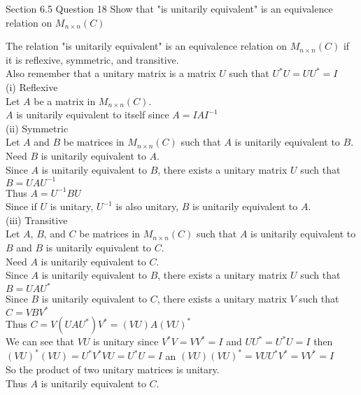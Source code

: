 \documentclass[answers,12pt,addpoints]{exam}
\begin{document}
\begin{questions}
    \question Section 6.5 Question 18
    Show that "is unitarily equivalent" is an equivalence relation on $M_{n\times n}(C)$
    \begin{solution}
        The relation "is unitarily equivalent" is an equivalence relation on $M_{n\times n}(C)$ if it is reflexive, symmetric, and transitive.\\
        Also remember that a unitary matrix is a matrix $U$ such that $U^*U = UU^* = I$\\

        (i) Reflexive\\
        Let $A$ be a matrix in $M_{n\times n}(C)$.\\
        $A$ is unitarily equivalent to itself since $A = IAI^{-1}$\\

        (ii) Symmetric\\
        Let $A$ and $B$ be matrices in $M_{n\times n}(C)$ such that $A$ is unitarily equivalent to $B$.\\
        Need $B$ is unitarily equivalent to $A$.\\
        Since $A$ is unitarily equivalent to $B$, there exists a unitary matrix $U$ such that $B = UAU^{-1}$\\
        Thus $A = U^{-1}BU$\\
        Since if $U$ is unitary, $U^{-1}$ is also unitary, $B$ is unitarily equivalent to $A$.\\

        (iii) Transitive\\
        Let $A$, $B$, and $C$ be matrices in $M_{n\times n}(C)$ such that $A$ is unitarily equivalent to $B$ and $B$ is unitarily equivalent to $C$.\\
        Need $A$ is unitarily equivalent to $C$.\\
        Since $A$ is unitarily equivalent to $B$, there exists a unitary matrix $U$ such that $B = UAU^{*}$\\
        Since $B$ is unitarily equivalent to $C$, there exists a unitary matrix $V$ such that $C = VBV^{*}$\\
        Thus $C = V(UAU^{*})V^{*} = (VU)A(VU)^{*}$\\
        We can see that $VU$ is unitary since $V^*V = VV^* = I$ and $UU^* = U^*U = I$ then  $(VU)^*(VU) = U^*V^*VU = U^*U = I$ an $(VU)(VU)^* = VUU^*V^* = VV^* = I$\\
        So the product of two unitary matrices is unitary.\\
        Thus $A$ is unitarily equivalent to $C$.\\
    \end{solution}

\end{questions}
\end{document}
